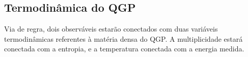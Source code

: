 \subsection{Termodinâmica do QGP}\label{termo}

Via de regra, dois observáveis estarão conectados com duas variáveis termodinâmicas referentes à matéria densa do QGP. A multiplicidade
estará conectada com a entropia, e a temperatura conectada com a energia medida. 